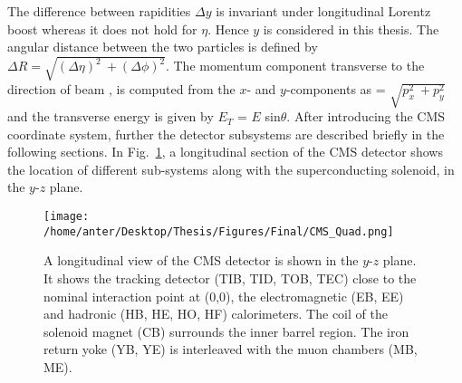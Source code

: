 The difference between rapidities $\Delta y$ is invariant under longitudinal Lorentz boost whereas it does not hold for $\eta$. Hence $y$ is considered in this thesis. The angular distance between the two particles is defined by $\Delta R = \sqrt{(\Delta \eta)^2~\plus (\Delta \phi)^2}$. The momentum component transverse to the direction of beam \pt, is computed from the $x$- and $y$-components as \pt = $\sqrt{p^2_x~\plus p^2_y}$ and the transverse energy is given by $E_T$ = $E$ sin$\theta$. After introducing the CMS coordinate system, further the detector subsystems are described briefly in the following sections. In Fig.~\ref{fig:CMS_quad}, a longitudinal section of the CMS detector shows the location of different sub-systems along with the superconducting solenoid, in the $y$-$z$ plane. 

\begin{figure}[!h]
\vspace*{3mm}
\begin{center} 
\hspace*{-5mm}
\texttt{[image: /home/anter/Desktop/Thesis/Figures/Final/CMS\_Quad.png]}
\vspace*{5mm}
\caption[A longitudinal view of the CMS detector is shown in the $y$-$z$ plane.]{A longitudinal view of the CMS detector is shown in the $y$-$z$ plane\footnotemark. It shows the tracking detector (TIB, TID, TOB, TEC) close to the nominal interaction point at (0,0), the electromagnetic (EB, EE) and hadronic (HB, HE, HO, HF) calorimeters. The coil of the solenoid magnet (CB) surrounds the inner barrel region. The iron return yoke (YB, YE) is interleaved with the muon chambers (MB, ME).}
\label{fig:CMS_quad}
\end{center}
\end{figure}

